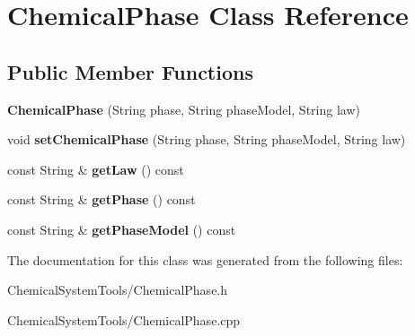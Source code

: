 \hypertarget{classChemicalPhase}{
\section{ChemicalPhase Class Reference}
\label{classChemicalPhase}
}
\subsection*{Public Member Functions}
\begin{DoxyCompactItemize}
\item 
\hypertarget{classChemicalPhase_aa73ef3b78a5dab9bffae03173a3f9d70}{
{\bfseries ChemicalPhase} (String phase, String phaseModel, String law)}
\label{classChemicalPhase_aa73ef3b78a5dab9bffae03173a3f9d70}

\item 
\hypertarget{classChemicalPhase_a23fc0a2d0d84959d653b2913ced12ed9}{
void {\bfseries setChemicalPhase} (String phase, String phaseModel, String law)}
\label{classChemicalPhase_a23fc0a2d0d84959d653b2913ced12ed9}

\item 
\hypertarget{classChemicalPhase_a46d6d3c2fb58213b8decaae5e5542a35}{
const String \& {\bfseries getLaw} () const }
\label{classChemicalPhase_a46d6d3c2fb58213b8decaae5e5542a35}

\item 
\hypertarget{classChemicalPhase_ad1dd0dc5eb3bbb4edaf5f83c43d1778c}{
const String \& {\bfseries getPhase} () const }
\label{classChemicalPhase_ad1dd0dc5eb3bbb4edaf5f83c43d1778c}

\item 
\hypertarget{classChemicalPhase_a81624aa6a6b8201ab2fd336a8be8466e}{
const String \& {\bfseries getPhaseModel} () const }
\label{classChemicalPhase_a81624aa6a6b8201ab2fd336a8be8466e}

\end{DoxyCompactItemize}


The documentation for this class was generated from the following files:\begin{DoxyCompactItemize}
\item 
ChemicalSystemTools/ChemicalPhase.h\item 
ChemicalSystemTools/ChemicalPhase.cpp\end{DoxyCompactItemize}
